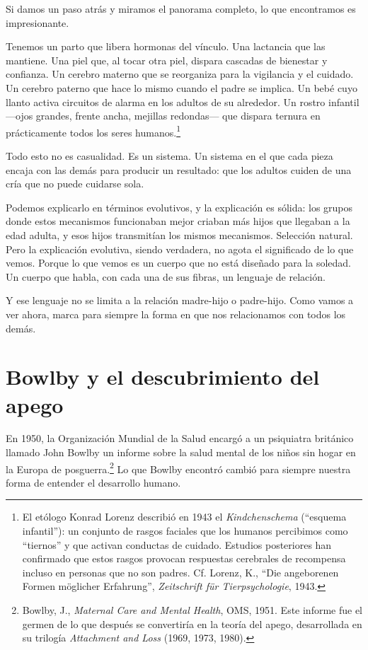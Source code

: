Si damos un paso atrás y miramos el panorama completo, lo que encontramos es impresionante.

Tenemos un parto que libera hormonas del vínculo. Una lactancia que las mantiene. Una piel que, al tocar otra piel, dispara cascadas de bienestar y confianza. Un cerebro materno que se reorganiza para la vigilancia y el cuidado. Un cerebro paterno que hace lo mismo cuando el padre se implica. Un bebé cuyo llanto activa circuitos de alarma en los adultos de su alrededor. Un rostro infantil ---ojos grandes, frente ancha, mejillas redondas--- que dispara ternura en prácticamente todos los seres humanos.\footnote{El etólogo Konrad Lorenz describió en 1943 el \textit{Kindchenschema} (``esquema infantil''): un conjunto de rasgos faciales que los humanos percibimos como ``tiernos'' y que activan conductas de cuidado. Estudios posteriores han confirmado que estos rasgos provocan respuestas cerebrales de recompensa incluso en personas que no son padres. Cf. Lorenz, K., ``Die angeborenen Formen möglicher Erfahrung'', \textit{Zeitschrift für Tierpsychologie}, 1943.}

Todo esto no es casualidad. Es un sistema. Un sistema en el que cada pieza encaja con las demás para producir un resultado: que los adultos cuiden de una cría que no puede cuidarse sola.

Podemos explicarlo en términos evolutivos, y la explicación es sólida: los grupos donde estos mecanismos funcionaban mejor criaban más hijos que llegaban a la edad adulta, y esos hijos transmitían los mismos mecanismos. Selección natural. Pero la explicación evolutiva, siendo verdadera, no agota el significado de lo que vemos. Porque lo que vemos es un cuerpo que no está diseñado para la soledad. Un cuerpo que habla, con cada una de sus fibras, un lenguaje de relación.

Y ese lenguaje no se limita a la relación madre-hijo o padre-hijo. Como vamos a ver ahora, marca para siempre la forma en que nos relacionamos con todos los demás.

\section{Bowlby y el descubrimiento del apego}

En 1950, la Organización Mundial de la Salud encargó a un psiquiatra británico llamado John Bowlby un informe sobre la salud mental de los niños sin hogar en la Europa de posguerra.\footnote{Bowlby, J., \textit{Maternal Care and Mental Health}, OMS, 1951. Este informe fue el germen de lo que después se convertiría en la teoría del apego, desarrollada en su trilogía \textit{Attachment and Loss} (1969, 1973, 1980).} Lo que Bowlby encontró cambió para siempre nuestra forma de entender el desarrollo humano.

